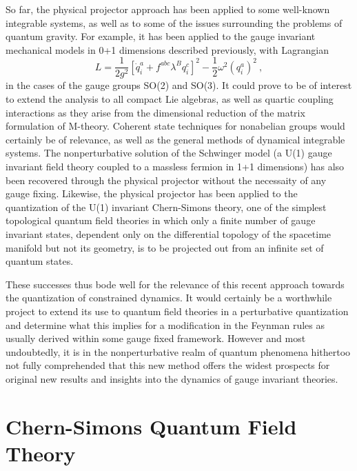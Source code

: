\documentclass[a4paper,11pt]{article}
\begin{document}
So far, the physical projector approach has been applied to some well-known
integrable systems, as well as to some of the issues surrounding the
problems of quantum gravity.\cite{Klaud4} For example, it has been 
applied\cite{JG3,JG7} to the gauge invariant mechanical models in 0+1 
dimensions described previously, with Lagrangian
\begin{equation}
L=\frac{1}{2g^2}\left[\dot{q}^a_i+f^{abc}\lambda^Bq^c_i\right]^2-
\frac{1}{2}\omega^2\left(q^a_i\right)^2\ ,
\end{equation}
in the cases of the gauge groups SO(2) and SO(3). It could prove to be
of interest to extend the analysis to all compact Lie algebras,
as well as quartic coupling interactions as they arise from the dimensional
reduction of the matrix formulation of M-theory. Coherent state techniques
for nonabelian groups would certainly be of relevance, as well as
the general methods of dynamical integrable systems. The nonperturbative
solution of the Schwinger model (a U(1) gauge invariant field theory
coupled to a massless fermion in 1+1 dimensions) has also been recovered
through the physical projector without the necessaity of any gauge 
fixing.\cite{JG8} Likewise, the physical projector has been applied\cite{JG9} 
to the quantization of the U(1) invariant Chern-Simons theory, one of the 
simplest topological quantum field theories in which only a finite number 
of gauge invariant states, dependent only on the differential topology of 
the spacetime manifold but not its geometry, is to be projected out 
from an infinite set of quantum states.

These successes thus bode well for the relevance of this recent
approach towards the quantization of constrained dynamics. It would
certainly be a worthwhile project to extend its use to quantum field
theories in a perturbative quantization and determine what this implies for
a modification in the Feynman rules as usually derived within some gauge 
fixed framework. However and most undoubtedly, it is in the
nonperturbative realm of quantum phenomena hithertoo not fully
comprehended that this new method offers the widest prospects for original 
new results and insights into the dynamics of gauge invariant theories.

\section{Chern-Simons Quantum Field Theory}
\label{Sect6}
\end{document}
